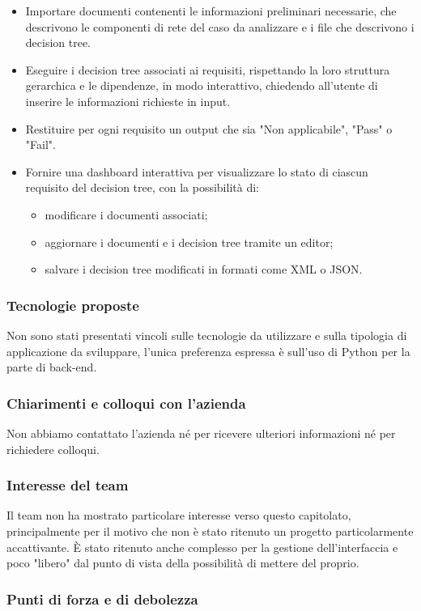 \documentclass[a4paper,11pt]{article}
\begin{document}
\begin{itemize}[leftmargin=*]
  \item Importare documenti contenenti le informazioni preliminari necessarie, che descrivono le componenti di rete del caso da analizzare e i file che descrivono i decision tree.
  \item Eseguire i decision tree associati ai requisiti, rispettando la loro struttura gerarchica e le dipendenze, in modo interattivo, chiedendo all'utente di inserire le informazioni richieste in input.
  \item Restituire per ogni requisito un output che sia "Non applicabile", "Pass" o "Fail".
  \item Fornire una dashboard interattiva per visualizzare lo stato di ciascun requisito del decision tree, con la possibilità di:
  \begin{itemize}[leftmargin=*]
    \item modificare i documenti associati; 
    \item aggiornare i documenti e i decision tree tramite un editor; 
    \item salvare i decision tree modificati in formati come XML o JSON.
  \end{itemize}
\end{itemize}
\subsubsection{Tecnologie proposte}
Non sono stati presentati vincoli sulle tecnologie da utilizzare e sulla tipologia di applicazione da sviluppare, l'unica preferenza espressa è sull'uso di Python per la parte di back-end.
\subsubsection{Chiarimenti e colloqui con l'azienda}
Non abbiamo contattato l'azienda né per ricevere ulteriori informazioni né per richiedere colloqui.
\subsubsection{Interesse del team}
Il team non ha mostrato particolare interesse verso questo capitolato, principalmente per il motivo che non è stato ritenuto un progetto particolarmente accattivante. È stato ritenuto anche complesso per la gestione dell'interfaccia e poco "libero" dal punto di vista della possibilità di mettere del proprio.
\newpage
\subsubsection{Punti di forza e di debolezza}
\end{document}
